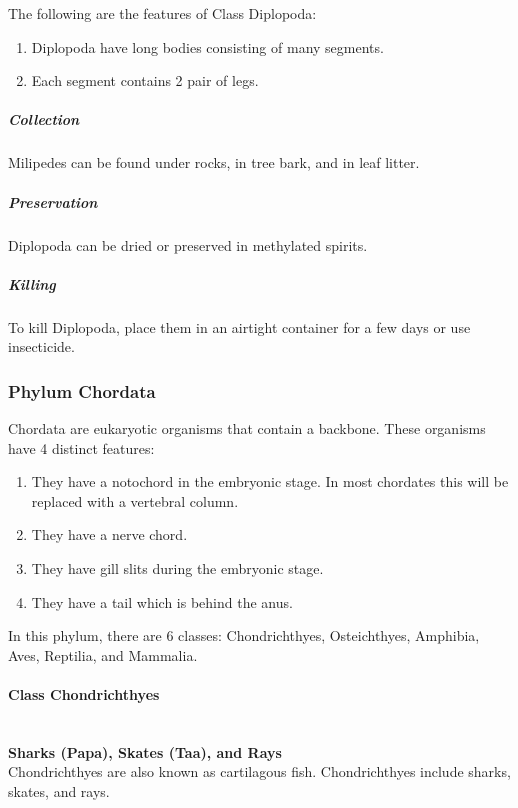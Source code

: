 \begin{multicols}{2}
The following are the features of Class Diplopoda:
\begin{enumerate}
\item{Diplopoda have long bodies consisting of many segments.}
\item{Each segment contains 2 pair of legs.}
\end{enumerate}

\subparagraph{Collection}
Milipedes can be found under rocks, in tree bark, and in leaf litter.

\subparagraph{Preservation} 
Diplopoda can be dried or preserved in methylated spirits.

\subparagraph{Killing}
To kill Diplopoda, place them in an airtight container for a few days or use insecticide.

%


\subsubsection{Phylum Chordata}
Chordata are eukaryotic organisms that contain a backbone. These organisms have 4 distinct features:
\begin{enumerate}
\item{They have a notochord in the embryonic stage. In most chordates this will be replaced with a vertebral column.}
\item{They have a nerve chord.}
\item{They have gill slits during the embryonic stage.}
\item{They have a tail which is behind the anus.}
\end{enumerate}

In this phylum, there are 6 classes: Chondrichthyes, Osteichthyes, Amphibia, Aves, Reptilia, and Mammalia.

\paragraph{Class Chondrichthyes}\hfill \\
\textbf{Sharks (Papa), Skates (Taa), and Rays}\\
Chondrichthyes are also known as cartilagous fish. Chondrichthyes include sharks, skates, and rays.


\end{multicols}
